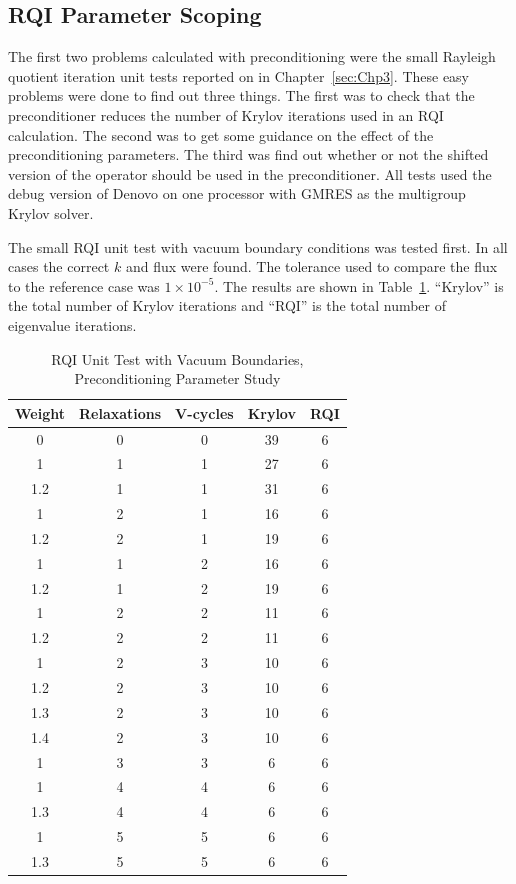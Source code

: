 \subsection{RQI Parameter Scoping}
The first two problems calculated with preconditioning were the small Rayleigh quotient iteration unit tests reported on in Chapter~\ref{sec:Chp3}. These easy problems were done to find out three things. The first was to check that the preconditioner reduces the number of Krylov iterations used in an RQI calculation. The second was to get some guidance on the effect of the preconditioning parameters. The third was find out whether or not the shifted version of the operator should be used in the preconditioner. All tests used the debug version of Denovo on one processor with GMRES as the multigroup Krylov solver.

The small RQI unit test with vacuum boundary conditions was tested first. In all cases the correct $k$ and flux were found. The tolerance used to compare the flux to the reference case was $1 \times 10^{-5}$. The results are shown in Table~\ref{table:RQIUnitTestVac}. ``Krylov'' is the total number of Krylov iterations and ``RQI'' is the total number of eigenvalue iterations.
%
\begin{table}[!h]
\caption{RQI Unit Test with Vacuum Boundaries, Preconditioning Parameter Study}
\begin{center}
\begin{tabular}{| c | c | c | c | c |}
\hline
Weight & Relaxations & V-cycles & Krylov & RQI \\[0.5ex]
\hline
0    & 0 & 0 & 39 & 6 \\
1    & 1 & 1 & 27 & 6 \\
1.2 & 1 & 1 & 31 & 6 \\
1    & 2 & 1 & 16 & 6 \\
1.2 & 2 & 1 & 19 & 6 \\
1    & 1 & 2 & 16 & 6 \\
1.2 & 1 & 2 & 19 & 6 \\
1    & 2 & 2 & 11 & 6 \\
1.2 & 2 & 2 & 11 & 6 \\
\hline
1    & 2 & 3 & 10 & 6 \\
1.2 & 2 & 3 & 10 & 6 \\
1.3 & 2 & 3 & 10 & 6 \\
1.4 & 2 & 3 & 10 & 6 \\
\hline
1    & 3 & 3 & 6   & 6 \\
1    & 4 & 4 & 6   & 6 \\
1.3 & 4 & 4 & 6   & 6 \\
1    & 5 & 5 & 6   & 6 \\
1.3 & 5 & 5 & 6   & 6 \\
\hline 
\end{tabular}
\end{center}
\label{table:RQIUnitTestVac}
\end{table}

